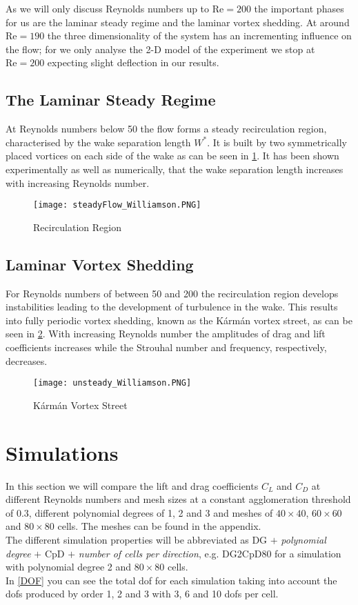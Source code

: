 	As we will only discuss Reynolds numbers up to $\text{Re} = 200$ the important phases for us are the laminar steady regime and the laminar vortex shedding. At around $\text{Re} = 190$ the three dimensionality of the system has an incrementing influence on the flow; for we only analyse the 2-D model of the experiment we stop at $\text{Re} = 200$ expecting slight deflection in our results.
	
	\subsection{The Laminar Steady Regime}
	
	At Reynolds numbers below 50 the flow forms a steady recirculation region, characterised by the wake separation length  $W^*$. It is built by two symmetrically placed vortices on each side of the wake as can be seen in \cref{fig:steady}. It has been shown experimentally as well as numerically, that the wake separation length increases with increasing Reynolds number. 
		\begin{figure}[htp]
			\centering
			\texttt{[image: steadyFlow\_Williamson.PNG]}
			\caption{Recirculation Region \cite{williamson1996vortex}}
			\label{fig:steady}
		\end{figure}
	\subsection{Laminar Vortex Shedding}
	For Reynolds numbers of between 50 and 200 the recirculation region develops instabilities leading to the development of turbulence in the wake. This results into fully periodic vortex shedding, known as the Kármán vortex street, as can be seen in \cref{fig:unsteady}. With increasing Reynolds number the amplitudes of drag and lift coefficients increases while the Strouhal number and frequency, respectively, decreases.
	
		\begin{figure}[htp]
			\centering
			\texttt{[image: unsteady\_Williamson.PNG]}
			\caption{Kármán Vortex Street \cite{williamson1996vortex}}
			\label{fig:unsteady}
		\end{figure}
		
\section{Simulations}
	In this section we will compare the lift and drag coefficients $C_L$ and $C_D$ at different Reynolds numbers and mesh sizes at a constant agglomeration threshold of $0.3$, different polynomial degrees of 1, 2 and 3 and meshes of $40 \times 40$, $60 \times 60$ and $80 \times 80$ cells. The meshes can be found in the appendix. \\\indent
	The different simulation properties will be abbreviated as DG $+$ \textit{polynomial degree} $+$ CpD $+$ \textit{number of cells per direction}, e.g. DG2CpD80 for a simulation with polynomial degree 2 and $80 \times 80$ cells.\\
	In \cref{DOF} you can see the total \gls{dof} for each simulation taking into account the \gls{dof}s produced by order 1, 2 and 3 with 3, 6 and 10 \gls{dof}s per cell.
	
